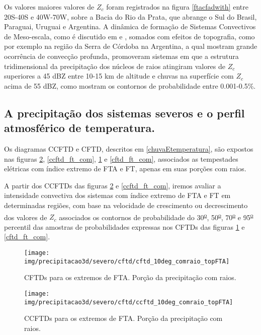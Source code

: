 Os valores maiores valores de $Z_c$ foram registrados na figura \ref{ftacfadwith} entre 20S-40S e 40W-70W, sobre a Bacia do Rio da Prata, que abrange o Sul do Brasil, Paraguai, Uruguai e Argentina. A dinâmica de formação de Sistemas Convectivos de Meso-escala, como é discutido em \cite{Velasco1987} e \cite{Durkee2009}, somados com efeitos de topografia, como por exemplo na região da Serra de Córdoba na Argentina, a qual \cite{Rasmussen2011} mostram grande ocorrência de convecção profunda, promoveram sistemas em que a estrutura tridimensional da precipitação dos núcleos de raios atingiram valores de $Z_c$ superiores a 45 dBZ entre 10-15 km de altitude e chuvas na superfície com $Z_c$ acima de 55 dBZ, como mostram os contornos de probabilidade entre 0.001-0.5\%.

\subsection{A precipitação dos sistemas severos e o perfil atmosférico de temperatura.}

Os diagramas CCFTD e CFTD, descritos em \ref{chuvaEtemperatura}, são expostos nas figuras \ref{ccftd_fta_com}, \ref{ccftd_ft_com}, \ref{cftd_fta_com} e \ref{cftd_ft_com}, associados as tempestades elétricas com índice extremo de FTA e FT, apenas em suas porções com raios.

A partir dos CCFTDs das figuras \ref{ccftd_fta_com} e \ref{ccftd_ft_com}, iremos avaliar a intensidade convectiva dos sistemas com índice extremo de FTA e FT em determinadas regiões, com base na velocidade de crescimento ou decrescimento dos valores de $Z_{c}$ associados os contornos de probabilidade do 30\textsuperscript{\underline{o}}, 50\textsuperscript{\underline{o}}, 70\textsuperscript{\underline{o}} e 95\textsuperscript{\underline{o}} percentil das amostras de probabilidades expressas nos CFTDs das figuras \ref{cftd_fta_com} e \ref{cftd_ft_com}.	

\begin{figure}[!ht]
  \centering
  \texttt{[image: img/precipitacao3d/severo/cftd/cftd\_10deg\_comraio\_topFTA]}
 \caption{CFTDs para os extremos de FTA. Porção da precipitação com raios.}
 \label{cftd_fta_com}
\end{figure} 

\begin{figure}[!ht]
  \centering
  \texttt{[image: img/precipitacao3d/severo/cftd/ccftd\_10deg\_comraio\_topFTA]}
  \caption{CCFTDs para os extremos de FTA. Porção da precipitação com raios.}
  \label{ccftd_fta_com}   
\end{figure} 

